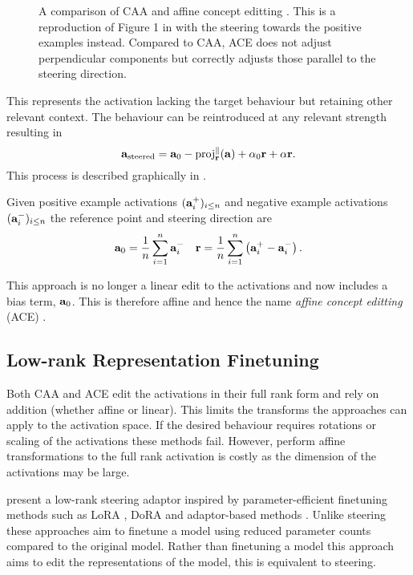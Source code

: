 \begin{figure}
    \centering
    \captionsetup{width=.9\textwidth}
    
    \caption{A comparison of CAA \citep{caa} and affine concept editting \citep{ace}. This is a reproduction of Figure 1 in \citet{ace} with the steering towards the positive examples instead. Compared to CAA, ACE does not adjust perpendicular components but correctly adjusts those parallel to the steering direction.}
    \label{fig:ace}
\end{figure}

This represents the activation lacking the target behaviour but retaining other relevant context.
The behaviour can be reintroduced at any relevant strength resulting in
\begin{equation}
    \label{eq:ace}
    \mathbf{a}_\text{steered} = \mathbf{a}_0 - \text{proj}_{\mathbf{r}}^{\parallel}(\mathbf{a}) + \alpha_0\mathbf{r} + \alpha\mathbf{r}.
\end{equation}
This process is described graphically in .

Given positive example activations $(\mathbf{a}_i^+)_{i\le n}$ and negative example activations $(\mathbf{a}_i^-)_{i\le n}$ the reference point and steering direction are
\begin{align*}
    \mathbf{a}_0 = \frac{1}{n}\sum_{i=1}^{n}\mathbf{a}_i^- && \mathbf{r} = \frac{1}{n}\sum_{i=1}^{n}\left(\mathbf{a}_i^+ - \mathbf{a}_i^-\right).
\end{align*}

This approach is no longer a linear edit to the activations and now includes a bias term, $\mathbf{a}_0$.
This is therefore affine and hence the name \textit{affine concept editting} (ACE) \citep{ace}.

\subsection{Low-rank Representation Finetuning}
\label{loreft}

Both CAA \citep{caa} and ACE \citep{ace} edit the activations in their full rank form and rely on addition (whether affine or linear).
This limits the transforms the approaches can apply to the activation space.
If the desired behaviour requires rotations or scaling of the activations these methods fail.
However, perform affine transformations to the full rank activation is costly as the dimension of the activations may be large.

\citet{reft} present a low-rank steering adaptor inspired by parameter-efficient finetuning methods such as LoRA \citep{lora}, DoRA \citep{dora} and adaptor-based methods \citep{petl}.
Unlike steering these approaches aim to finetune a model using reduced parameter counts compared to the original model.
Rather than finetuning a model this approach aims to edit the representations of the model, this is equivalent to steering.

